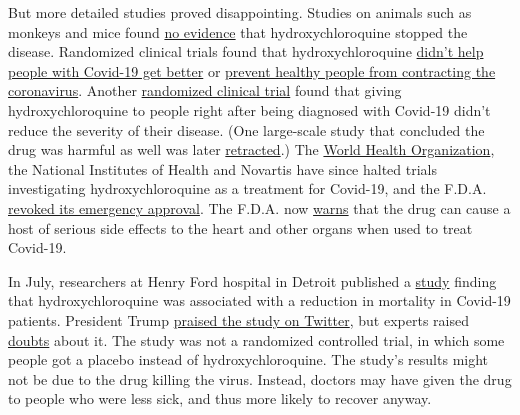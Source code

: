 But more detailed studies proved disappointing. Studies on animals such
as monkeys and mice found
\href{https://www.nature.com/articles/s41467-020-17907-w}{no evidence}
that hydroxychloroquine stopped the disease. Randomized clinical trials
found that hydroxychloroquine
\href{https://www.recoverytrial.net/news/statement-from-the-chief-investigators-of-the-randomised-evaluation-of-covid-19-therapy-recovery-trial-on-hydroxychloroquine-5-june-2020-no-clinical-benefit-from-use-of-hydroxychloroquine-in-hospitalised-patients-with-covid-19}{didn't
help people with Covid-19 get better} or
\href{https://www.nytimes3xbfgragh.onion/2020/06/03/health/hydroxychloroquine-coronavirus-trump.html}{prevent
healthy people from contracting the coronavirus}. Another
\href{https://www.acpjournals.org/doi/10.7326/M20-4207}{randomized
clinical trial} found that giving hydroxychloroquine to people right
after being diagnosed with Covid-19 didn't reduce the severity of their
disease. (One large-scale study that concluded the drug was harmful as
well was later
\href{https://www.nytimes3xbfgragh.onion/2020/06/04/health/coronavirus-hydroxychloroquine.html?searchResultPosition=1}{retracted}.)
The
\href{https://www.who.int/news-room/detail/04-07-2020-who-discontinues-hydroxychloroquine-and-lopinavir-ritonavir-treatment-arms-for-covid-19}{World
Health Organization}, the National Institutes of Health and Novartis
have since halted trials investigating hydroxychloroquine as a treatment
for Covid-19, and the F.D.A.
\href{https://www.nytimes3xbfgragh.onion/2020/06/15/health/fda-hydroxychloroquine-malaria.html}{revoked
its emergency approval}. The F.D.A. now
\href{https://www.fda.gov/drugs/drug-safety-and-availability/fda-cautions-against-use-hydroxychloroquine-or-chloroquine-covid-19-outside-hospital-setting-or}{warns}
that the drug can cause a host of serious side effects to the heart and
other organs when used to treat Covid-19.

In July, researchers at Henry Ford hospital in Detroit published a
\href{https://www.statnews.com/2020/07/08/a-flawed-covid-19-study-gets-the-white-houses-attention-and-the-fda-may-pay-the-price/}{study}
finding that hydroxychloroquine was associated with a reduction in
mortality in Covid-19 patients. President Trump
\href{https://twitter.com/realDonaldTrump/status/1280328830218051584}{praised
the study on Twitter}, but experts raised
\href{https://www.sciencedirect.com/science/article/pii/S1201971220305300?dgcid=rss_sd_all}{doubts}
about it. The study was not a randomized controlled trial, in which some
people got a placebo instead of hydroxychloroquine. The study's results
might not be due to the drug killing the virus. Instead, doctors may
have given the drug to people who were less sick, and thus more likely
to recover anyway.

